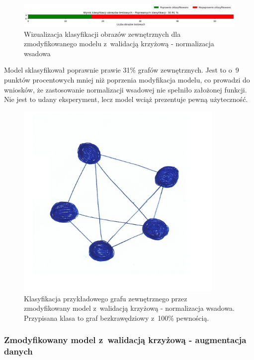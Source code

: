 \begin{figure}[ht]
	\centering
	\includegraphics[width=14cm]{resources/tests/images/v4/crossvalid_2_bar.png}
	\caption{Wizualizacja klasyfikacji obrazów zewnętrznych dla zmodyfikowanego modelu z~walidacją krzyżową - normalizacja wsadowa}
	\label{Fig:tests-cv-2c}
\end{figure}
\FloatBarrier

Model sklasyfikował poprawnie prawie 31\% grafów zewnętrznych.
Jest to o~9 punktów procentowych mniej niż poprzenia modyfikacja modelu,
co prowadzi do wniosków, że zastosowanie normalizacji wsadowej nie spełniło założonej funkcji.
Nie jest to udany eksperyment, lecz model wciąż prezentuje pewną użyteczność.

\begin{figure}[ht]
	\centering
	\includegraphics[width=10cm]{../graph_classification/test_graphs/drawn/full-8.png}
	\caption{Klasyfikacja przykładowego grafu zewnętrznego przez zmodyfikowany model z~walidacją krzyżową - normalizacja wsadowa.
		Przypisana klasa to graf bezkrawędziowy z~100\% pewnością.}
	\label{Fig:tests-cv-2d}
\end{figure}
\FloatBarrier

\subsubsection{Zmodyfikowany model z~walidacją krzyżową - augmentacja danych}

